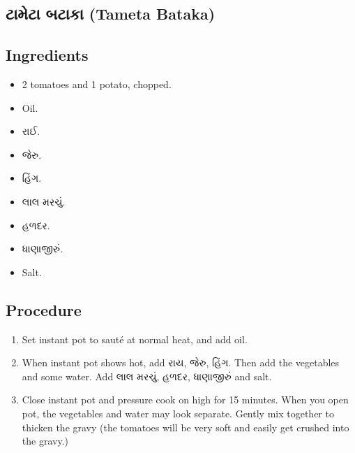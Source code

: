 \documentclass[../../recipes.tex]{subfiles}
\begin{document}
\begin{gujarati}

\chapter{ટામેટા બટાકા (Tameta Bataka)}

\section*{Ingredients}

\begin{itemize}
    \item 2 tomatoes and 1 potato, chopped.
    \item Oil.
    \item રાઈ.
    \item જેરુ.
    \item હિંગ.
    \item લાલ મરચું.
    \item હળદર.
    \item ધાણાજીરું.
    \item Salt.
\end{itemize}

\noindent
\section*{Procedure}

\begin{enumerate}
    \item Set instant pot to sauté at normal heat, and add oil.
    \item When instant pot shows hot, add રાય, જેરુ, હિંગ. Then add the vegetables and some water. Add લાલ મરચું, હળદર, ધાણાજીરું and salt.
    \item Close instant pot and pressure cook on high for 15 minutes. When you open pot, the vegetables and water may look separate. Gently mix together to thicken the gravy (the tomatoes will be very soft and easily get crushed into the gravy.)
\end{enumerate}

\end{gujarati}
\end{document}
